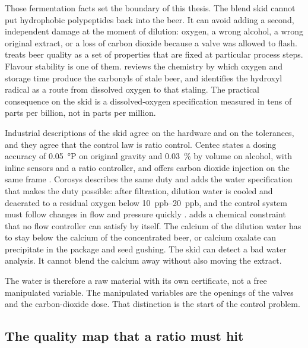 Those fermentation facts set the boundary of this thesis. The blend skid cannot put hydrophobic polypeptides back into the beer. It can avoid adding a second, independent damage at the moment of dilution: oxygen, a wrong alcohol, a wrong original extract, or a loss of carbon dioxide because a valve was allowed to flash. \citet{bamforth2009} treats beer quality as a set of properties that are fixed at particular process steps. Flavour stability is one of them. \citet{vanderhaegen2006} reviews the chemistry by which oxygen and storage time produce the carbonyls of stale beer, and \citet{uchida1996} identifies the hydroxyl radical as a route from dissolved oxygen to that staling. The practical consequence on the skid is a dissolved-oxygen specification measured in tens of parts per billion, not in parts per million.

Industrial descriptions of the skid agree on the hardware and on the tolerances, and they agree that the control law is ratio control. Centec states a dosing accuracy of \SI{0.05}{\degree}P on original gravity and \SI{0.03}{\percent} by volume on alcohol, with inline sensors and a ratio controller, and offers carbon dioxide injection on the same frame \citep{centec2024}. Corosys describes the same duty and adds the water specification that makes the duty possible: after filtration, dilution water is cooled and deaerated to a residual oxygen below \SIrange{10}{20}{ppb}, and the control system must follow changes in flow and pressure quickly \citep{corosysweb}. \citet{palmer2013} adds a chemical constraint that no flow controller can satisfy by itself. The calcium of the dilution water has to stay below the calcium of the concentrated beer, or calcium oxalate can precipitate in the package and seed gushing. The skid can detect a bad water analysis. It cannot blend the calcium away without also moving the extract.

The water is therefore a raw material with its own certificate, not a free manipulated variable. The manipulated variables are the openings of the valves and the carbon-dioxide dose. That distinction is the start of the control problem.

\subsection{The quality map that a ratio must hit}

